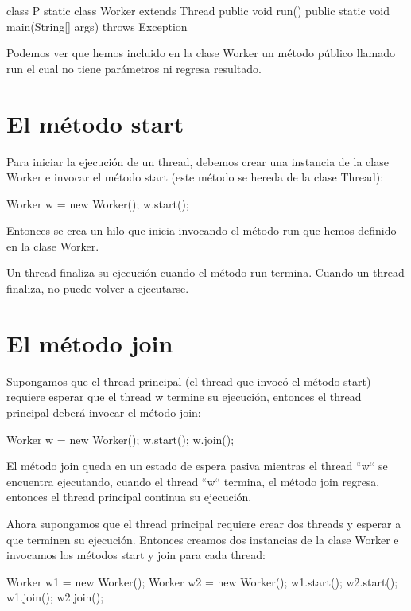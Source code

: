 \begin{SourceCode}
class P
{
  static class Worker extends Thread
  {
    public void run()
    {
    }
  }
  public static void main(String[] args) throws Exception
  {
  }
}
\end{SourceCode}

Podemos ver que hemos incluido en la clase Worker un método público llamado run el cual no tiene parámetros ni regresa resultado.

\section{El método start}

Para iniciar la ejecución de un thread, debemos crear una instancia de la clase Worker e invocar el método start (este método se hereda de la clase Thread):

\begin{SourceCode}
Worker w = new Worker();
w.start();
\end{SourceCode}

Entonces se crea un hilo que inicia invocando el método run que hemos definido en la clase Worker.

Un thread finaliza su ejecución cuando el método run termina. Cuando un thread finaliza, no puede volver a ejecutarse.

\section{El método join}

Supongamos que el thread principal (el thread que invocó el método start) requiere esperar que el thread w termine su ejecución, entonces el thread principal deberá invocar el método join:

\begin{SourceCode}
Worker w = new Worker();
w.start();
w.join();
\end{SourceCode}

El método join queda en un estado de espera pasiva mientras el thread ``w`` se encuentra ejecutando, cuando el thread ``w`` termina, el método join regresa, entonces el thread principal continua su ejecución.

Ahora supongamos que el thread principal requiere crear dos threads y esperar a que terminen su ejecución. Entonces creamos dos instancias de la clase Worker e invocamos los métodos start y join para cada thread:

\begin{SourceCode}
Worker w1 = new Worker();
Worker w2 = new Worker();
w1.start();
w2.start();
w1.join();
w2.join();
\end{SourceCode}

